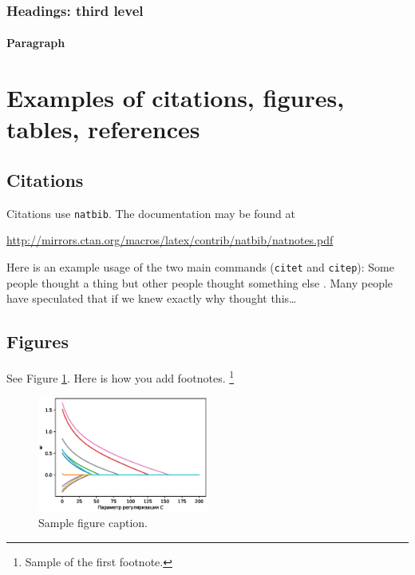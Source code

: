 \documentclass{article}
\begin{document}
\subsubsection{Headings: third level}
\lipsum[6]

\paragraph{Paragraph}
\lipsum[7]



\section{Examples of citations, figures, tables, references}
\label{sec:others}

\subsection{Citations}
Citations use \verb+natbib+. The documentation may be found at
\begin{center}
	\url{http://mirrors.ctan.org/macros/latex/contrib/natbib/natnotes.pdf}
\end{center}

Here is an example usage of the two main commands (\verb+citet+ and \verb+citep+): Some people thought a thing \citep{kour2014real, hadash2018estimate} but other people thought something else \citep{kour2014fast}. Many people have speculated that if we knew exactly why \citet{kour2014fast} thought this\dots

\subsection{Figures}
\lipsum[10]
See Figure \ref{fig:fig1}. Here is how you add footnotes. \footnote{Sample of the first footnote.}
\lipsum[11]

\begin{figure}
	\centering
	\includegraphics[width=0.5\textwidth]{../figures/log_reg_cs_exp.eps}
	\caption{Sample figure caption.}
	\label{fig:fig1}
\end{figure}
\end{document}
